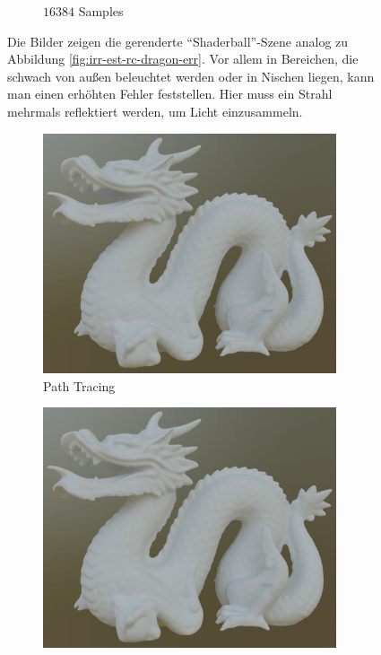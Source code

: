 \begin{figure}[h]
\begin{subfigure}[b]{0.33\textwidth}
				\caption{$16384$ Samples}
			\end{subfigure}
			\caption{Die Bilder zeigen die gerenderte \enquote{Shaderball}-Szene analog zu Abbildung \ref{fig:irr-est-rc-dragon-err}. Vor allem in Bereichen, die schwach von außen beleuchtet werden oder in Nischen liegen, kann man einen erhöhten Fehler feststellen. Hier muss ein Strahl mehrmals reflektiert werden, um Licht einzusammeln.}
			\label{fig:irr-est-rc-shaderball-err}
		\end{figure}

		\begin{figure}[h]
			\begin{subfigure}[t]{0.5\textwidth}
				\center
				\includegraphics[width=0.95\textwidth]{pic/irr_est-ra-dragon-ref.png}
				\caption{Path Tracing}
			\end{subfigure}
			\begin{subfigure}[t]{0.5\textwidth}
				\center
				\includegraphics[width=0.95\textwidth]{pic/irr_est-ra-dragon-irr.png}

\end{subfigure}
\end{figure}
